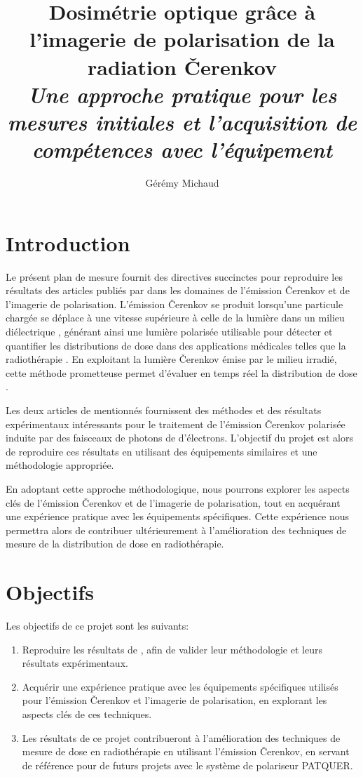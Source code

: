 \documentclass{Thesis}
\title{Dosimétrie optique grâce à l'imagerie de polarisation de la radiation Čerenkov
\\\Large{\textit{Une approche pratique pour les mesures initiales et l'acquisition de compétences avec l'équipement}}}
\author{Gérémy Michaud}{G. Michaud}
\begin{document}
\section*{Introduction}
Le présent plan de mesure fournit des directives succinctes pour reproduire les
résultats des articles publiés par  \cite{cloutierAccurateDoseMeasurements2022, cloutierDirectInwaterRadiation2022}
dans les domaines de l'émission Čerenkov et de l'imagerie de polarisation.
L'émission Čerenkov se produit lorsqu'une particule chargée se déplace à une vitesse supérieure à celle de la lumière
dans un milieu diélectrique \cite{cerenkovVisibleRadiationProduced1937},
générant ainsi une lumière polarisée utilisable pour détecter et quantifier les distributions de dose dans des applications médicales telles que la radiothérapie \cite{ashrafDosimetryFLASHRadiotherapy2020}.
En exploitant la lumière Čerenkov émise par le milieu irradié, cette méthode prometteuse permet d'évaluer en temps réel la distribution de dose \cite{jarvisCherenkovVideoImaging2014}.

Les deux articles de  mentionnés fournissent des méthodes et des résultats expérimentaux
intéressants pour le traitement de l'émission Čerenkov polarisée induite par des faisceaux de photons de d'électrons.
L'objectif du projet est alors de reproduire ces résultats en utilisant des équipements similaires et une méthodologie appropriée.

En adoptant cette approche méthodologique, nous pourrons explorer les aspects clés de
l'émission Čerenkov et de l'imagerie de polarisation, tout en acquérant une expérience
pratique avec les équipements spécifiques. Cette expérience nous permettra alors de contribuer ultérieurement
à l'amélioration des techniques de mesure de la distribution de dose en radiothérapie.

\section*{Objectifs}
Les objectifs de ce projet sont les suivants:
\begin{enumerate}
    \setlength\itemsep{1mm}
    \item Reproduire les résultats de , afin de valider leur méthodologie et leurs résultats expérimentaux.
    \item Acquérir une expérience pratique avec les équipements spécifiques utilisés pour l'émission Čerenkov et l'imagerie de polarisation, en explorant les aspects clés de ces techniques.
    \item Les résultats de ce projet contribueront à l'amélioration des techniques de mesure de dose en radiothérapie en utilisant l'émission Čerenkov, en servant de référence pour de futurs projets avec le système de polariseur PATQUER.
\end{enumerate}
\end{document}
